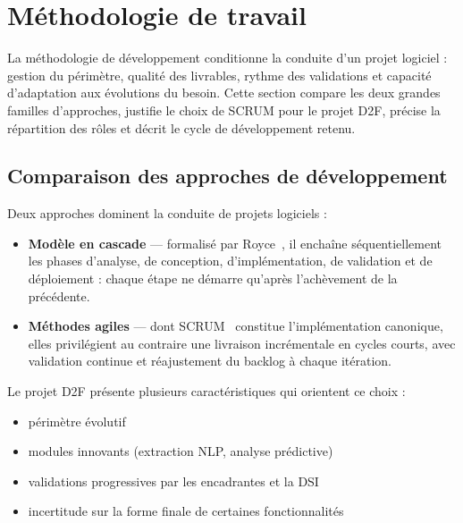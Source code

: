 \documentclass[12pt,a4paper]{report}
\begin{document}
\section{Méthodologie de travail}

La méthodologie de développement conditionne la conduite d'un projet logiciel :
gestion du périmètre, qualité des livrables, rythme des validations et capacité
d'adaptation aux évolutions du besoin. Cette section compare les deux grandes
familles d'approches, justifie le choix de SCRUM pour le projet D2F, précise la
répartition des rôles et décrit le cycle de développement retenu.

\subsection{Comparaison des approches de développement}

Deux approches dominent la conduite de projets logiciels :

\begin{itemize}[leftmargin=1.2cm, itemsep=6pt]
  \item \textbf{Modèle en cascade} — formalisé par
  Royce~\cite{royce1970waterfall}, il enchaîne séquentiellement les
  phases d'analyse, de conception, d'implémentation, de validation et
  de déploiement : chaque étape ne démarre qu'après l'achèvement de
  la précédente.

  \item \textbf{Méthodes agiles} — dont SCRUM~\cite{schwaber2020scrum,
  sutherland2014scrum} constitue l'implémentation canonique, elles
  privilégient au contraire une livraison incrémentale en cycles courts,
  avec validation continue et réajustement du backlog à chaque itération.
\end{itemize}

Le projet D2F présente plusieurs caractéristiques qui orientent ce choix :

\begin{itemize}[leftmargin=1.2cm, itemsep=4pt]
  \item périmètre évolutif
  \item modules innovants (extraction NLP, analyse prédictive)
  \item validations progressives par les encadrantes et la DSI
  \item incertitude sur la forme finale de certaines fonctionnalités
\end{itemize}
\end{document}
